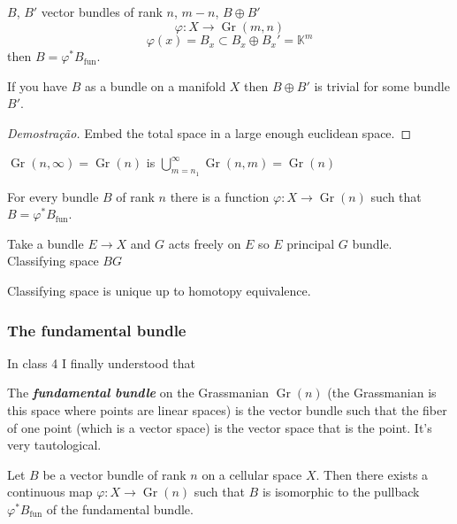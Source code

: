 \begin{claim}
	$B$, $B'$ vector bundles of rank $n$, $m-n$, $B\oplus B'$
	\[\varphi:X\to \operatorname{Gr}(m,n)\]
	\[\varphi (x)=B_x\subset B_x\oplus B_x'=\mathbb{K}^m\]
	then $B=\varphi^* B_{\operatorname{fun}}$.
\end{claim}

\begin{thm}\leavevmode
	If you have $B$ as a bundle on a manifold $X$ then $B\oplus B'$ is trivial for some bundle $B'$.
\end{thm}

\begin{proof}[Demostra\c c\~ao]
	Embed the total space in a large enough euclidean space.
\end{proof}

\begin{defn}
	$\operatorname{Gr}(n,\infty)=\operatorname{Gr}(n)$ is $\bigcup_{m=n_1}^\infty\operatorname{Gr}(n,m)=\operatorname{Gr}(n) $
\end{defn}

\begin{coro}
	For every bundle  $B$ of rank $n$ there is a function $\varphi:X\to \operatorname{Gr}(n)$ such that $B=\varphi^*B_{\operatorname{fun}}$.
\end{coro}

Take a bundle $E\to X$ and $G$ acts freely on $E$ so $E$ principal $G$ bundle. Classifying space  $BG$

\begin{thm}\leavevmode
	Classifying space is unique up to homotopy equivalence.
\end{thm}

\subsubsection{The fundamental bundle}

In class 4 I finally understood that

\begin{defn}
	The \textit{\textbf{fundamental bundle}} on the Grassmanian  $\operatorname{Gr}(n)$ (the Grassmanian is this space where points are linear spaces) is the vector bundle such that the fiber of one point (which is a vector space) is the vector space that is the point. It's very tautological.
\end{defn}

\begin{thm}\leavevmode
	Let $B$ be a vector bundle of rank $n$ on a cellular space $X$. Then there exists a continuous map $\varphi:X\to \operatorname{Gr}(n)$ such that $ B$ is isomorphic to the pullback $\varphi^*B_{\operatorname{fun}}$ of the fundamental bundle.
\end{thm}

